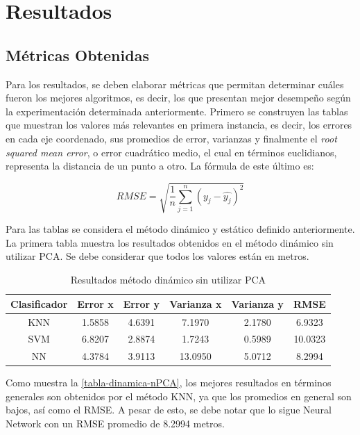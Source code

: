\chapter{Resultados}

\section{Métricas Obtenidas}

Para los resultados, se deben elaborar métricas que permitan determinar cuáles fueron los mejores algoritmos, es decir, los que presentan mejor desempeño según la experimentación determinada anteriormente. Primero se construyen las tablas que muestran los valores más relevantes en primera instancia, es decir, los errores en cada eje coordenado, sus promedios de error, varianzas y finalmente el \textit{root squared mean error}, o error cuadrático medio, el cual en términos euclidianos, representa la distancia de un punto a otro. La fórmula de este último es:

\begin{equation}
RMSE = \sqrt{\frac{1}{n} \sum_{j=1}^{n}(y_{j} - \hat{y_{j}})^{2}} 
\end{equation}

Para las tablas se considera el método dinámico y estático definido anteriormente. La primera tabla muestra los resultados obtenidos en el método dinámico sin utilizar PCA. Se debe considerar que todos los valores están en metros.


\begin{table}[ht!]
\centering
\caption[Resultados método dinámico sin  utilizar PCA]{Resultados método dinámico sin  utilizar PCA}
\label{tabla-dinamica-nPCA}
\begin{tabular}{|c|c|c|c|c|c|}
\hline
Clasificador & Error x & Error y & Varianza x & Varianza y & RMSE    \\ \hline
KNN          & 1.5858  & 4.6391  & 7.1970     & 2.1780     & 6.9323  \\ \hline
SVM          & 6.8207  & 2.8874  & 1.7243     & 0.5989     & 10.0323 \\ \hline
NN           & 4.3784  & 3.9113  & 13.0950    & 5.0712     & 8.2994  \\ \hline
\end{tabular}
\end{table}


Como muestra la \autoref{tabla-dinamica-nPCA}, los mejores resultados en términos generales son obtenidos por el método KNN, ya que los promedios en general son bajos, así como el RMSE. A pesar de esto, se debe notar que lo sigue Neural Network con un RMSE promedio de 8.2994 metros. 

